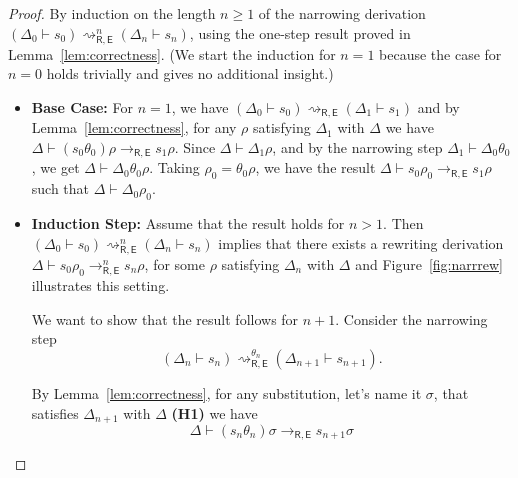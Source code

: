 \documentclass[11pt,a4paper]{amsart}
\newcommand{\daniele}[1]{\textcolor{cyan}{#1}}
\newcommand{\theory}[1]{\ensuremath{\mathsf{#1}}}
\theoremstyle{plain}
\theoremstyle{definition}
\theoremstyle{remark}
\begin{document}
\begin{proof}
By induction on the length $n\geq 1$ of the narrowing derivation $(\Delta_0\vdash s_0) \rightsquigarrow^{n}_{\theory{R,E}} (\Delta_n \vdash s_n)$, 
using the one-step result proved in Lemma~\ref{lem:correctness}. (We start the induction for $n=1$ because the case for $n=0$ holds trivially and gives no additional insight.) 
\begin{itemize}
    \item \textbf{Base Case:} For $n=1$, 
    we have $(\Delta_0\vdash s_0) \rightsquigarrow_{\theory{R,E}} (\Delta_1 \vdash s_1)$ and by Lemma~\ref{lem:correctness}, for any $\rho$ satisfying $\Delta_1$ with $\Delta$ we have $\Delta \vdash  (s_0\theta_0)\rho \rightarrow_{\theory{R,E}} s_1\rho$. Since $\Delta\vdash \Delta_1\rho$, and by the narrowing step $\Delta_1\vdash \Delta_0\theta_0$, we get $\Delta\vdash \Delta_0\theta_0\rho$. Taking $\rho_0 = \theta_0\rho$, we have the result
    $\Delta\vdash s_0\rho_0 \to_\theory{R,E} s_1\rho$
    such that $\Delta\vdash \Delta_0\rho_0$.
    \item \textbf{Induction Step:} Assume that the result holds for $n>1$. Then 
    $(\Delta_0 \vdash s_0) \rightsquigarrow^{n}_{\theory{R,E}} (\Delta_n \vdash s_n)$
    implies that there exists a rewriting derivation
    $\Delta \vdash s_0\rho_0 \rightarrow^{n}_{\theory{R,E}} s_n\rho$, for some $\rho$ satisfying $\Delta_n$ with $\Delta$
    and Figure~\ref{fig:narrrew} illustrates this setting.
    
    We want to show that the result follows for $n+1$. Consider the narrowing step 
    $$(\Delta_n \vdash s_n) \rightsquigarrow^{\theta_n}_\theory{R,E} (\Delta_{n+1} \vdash s_{n+1}).$$
    
    
   By Lemma~\ref{lem:correctness}, for any substitution, let's name it $\sigma$, that satisfies $\Delta_{n+1}$ with $\Delta$ {\bf (H1)}
    we have
    \begin{equation}\label{eq:narrow}
        \Delta \vdash (s_n\theta_n)\sigma \to_{\theory{R,E}} s_{n+1}\sigma
    \end{equation}
  

\end{itemize}
\end{proof}
\end{document}
